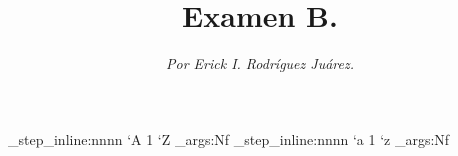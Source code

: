 
\author{\textit{Por Erick I. Rodríguez Juárez.}}
\title{Examen B.}

\usepackage{xltxtra}
\usepackage{amsfonts}
\usepackage{amsmath}
\usepackage{amssymb}
\usepackage{fontspec}
\usepackage[margin=0.3in]{geometry}

\setmainfont[
  BoldFont       = bodonibi,
	ItalicFont     = Century modern italic2.ttf,
	BoldItalicFont = bodonibi,
	SmallCapsFont  = lmromancaps10-regular.otf
]{Century_modern.ttf}

\newcommand{\titulo}{
\addfontfeature{LetterSpace=-5}
\pagestyle{empty}
\maketitle 
\thispagestyle{empty}
} 
\newcommand{\dis}{\displaystyle}
\newcommand{\qed}{\hspace{0.5cm}\rule{0.16cm}{0.4cm}}
\newcommand{\operator}[1]{\mathop{\vphantom{\sum}\mathchoice
{\vcenter{\hbox{\huge $#1$}}}
{\vcenter{\hbox{\Large $#1$}}}{#1}{#1}}\displaylimits}
\newcommand{\suma}{\operator{\texttt{[image: IMAGENES/Sigma.png]}}}
\setlength{\parindent}{0mm}

\ExplSyntaxOn
\int_step_inline:nnnn { `A } { 1 } { `Z }
 {  \exp_args:Nf  }
\int_step_inline:nnnn { `a } { 1 } { `z } {  \exp_args:Nf }
\ExplSyntaxOff
